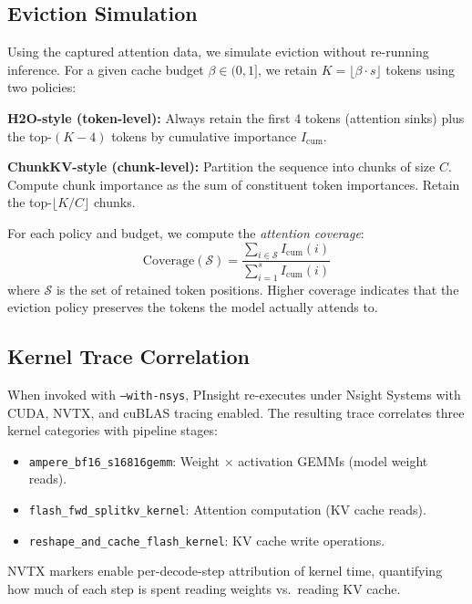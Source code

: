 \documentclass[conference]{IEEEtran}
\begin{document}
\subsection{Eviction Simulation}

Using the captured attention data, we simulate eviction without re-running inference. For a given cache budget $\beta \in (0, 1]$, we retain $K = \lfloor \beta \cdot s \rfloor$ tokens using two policies:

\textbf{H2O-style (token-level):} Always retain the first 4 tokens (attention sinks) plus the top-$(K-4)$ tokens by cumulative importance $I_{\text{cum}}$.

\textbf{ChunkKV-style (chunk-level):} Partition the sequence into chunks of size $C$. Compute chunk importance as the sum of constituent token importances. Retain the top-$\lfloor K/C \rfloor$ chunks.

For each policy and budget, we compute the \textit{attention coverage}:
\begin{equation}
\text{Coverage}(\mathcal{S}) = \frac{\sum_{i \in \mathcal{S}} I_{\text{cum}}(i)}{\sum_{i=1}^{s} I_{\text{cum}}(i)}
\end{equation}
where $\mathcal{S}$ is the set of retained token positions. Higher coverage indicates that the eviction policy preserves the tokens the model actually attends to.

\subsection{Kernel Trace Correlation}

When invoked with \texttt{--with-nsys}, PInsight re-executes under Nsight Systems with CUDA, NVTX, and cuBLAS tracing enabled. The resulting trace correlates three kernel categories with pipeline stages:

\begin{itemize}
\item \texttt{ampere\_bf16\_s16816gemm}: Weight $\times$ activation GEMMs (model weight reads).
\item \texttt{flash\_fwd\_splitkv\_kernel}: Attention computation (KV cache reads).
\item \texttt{reshape\_and\_cache\_flash\_kernel}: KV cache write operations.
\end{itemize}

NVTX markers enable per-decode-step attribution of kernel time, quantifying how much of each step is spent reading weights vs.\ reading KV cache.
\end{document}
